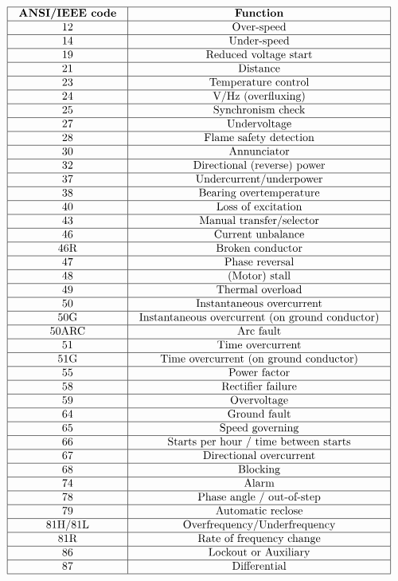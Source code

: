 $$\vbox{\offinterlineskip
\halign{\strut
\vrule \quad\hfil # \ \hfil & 
\vrule \quad\hfil # \ \hfil \vrule \cr
\noalign{\hrule}
%
\textbf{ANSI/IEEE code} & \textbf{Function} \cr
%
\noalign{\hrule}
%
12 & Over-speed \cr
%
\noalign{\hrule}
%
14 & Under-speed \cr
%
\noalign{\hrule}
%
19 & Reduced voltage start \cr
%
\noalign{\hrule}
%
21 & Distance \cr
%
\noalign{\hrule}
%
23 & Temperature control \cr
%
\noalign{\hrule}
%
24 & V/Hz (overfluxing) \cr
%
\noalign{\hrule}
%
25 & Synchronism check \cr
%
\noalign{\hrule}
%
27 & Undervoltage \cr
%
\noalign{\hrule}
%
28 & Flame safety detection \cr
%
\noalign{\hrule}
%
30 & Annunciator \cr
%
\noalign{\hrule}
%
32 & Directional (reverse) power \cr
%
\noalign{\hrule}
%
37 & Undercurrent/underpower \cr
%
\noalign{\hrule}
%
38 & Bearing overtemperature \cr
%
\noalign{\hrule}
%
40 & Loss of excitation \cr
%
\noalign{\hrule}
%
43 & Manual transfer/selector \cr
%
\noalign{\hrule}
%
46 & Current unbalance \cr
%
\noalign{\hrule}
%
46R & Broken conductor \cr
%
\noalign{\hrule}
%
47 & Phase reversal \cr
%
\noalign{\hrule}
%
48 & (Motor) stall \cr
%
\noalign{\hrule}
%
49 & Thermal overload \cr
%
\noalign{\hrule}
%
50 & Instantaneous overcurrent \cr
%
\noalign{\hrule}
%
50G & Instantaneous overcurrent (on ground conductor) \cr
%
\noalign{\hrule}
%
50ARC & Arc fault \cr
%
\noalign{\hrule}
%
51 & Time overcurrent \cr
%
\noalign{\hrule}
%
51G & Time overcurrent (on ground conductor) \cr
%
\noalign{\hrule}
%
55 & Power factor \cr
%
\noalign{\hrule}
%
58 & Rectifier failure \cr
%
\noalign{\hrule}
%
59 & Overvoltage \cr
%
\noalign{\hrule}
%
64 & Ground fault \cr
%
\noalign{\hrule}
%
65 & Speed governing \cr
%
\noalign{\hrule}
%
66 & Starts per hour / time between starts \cr
%
\noalign{\hrule}
%
67 & Directional overcurrent \cr
%
\noalign{\hrule}
%
68 & Blocking \cr
%
\noalign{\hrule}
%
74 & Alarm \cr
%
\noalign{\hrule}
%
78 & Phase angle / out-of-step \cr
%
\noalign{\hrule}
%
79 & Automatic reclose \cr
%
\noalign{\hrule}
%
81H/81L & Overfrequency/Underfrequency \cr
%
\noalign{\hrule}
%
81R & Rate of frequency change \cr
%
\noalign{\hrule}
%
86 & Lockout or Auxiliary \cr
%
\noalign{\hrule}
%
87 & Differential \cr
%
\noalign{\hrule}
} %
}$$ %

